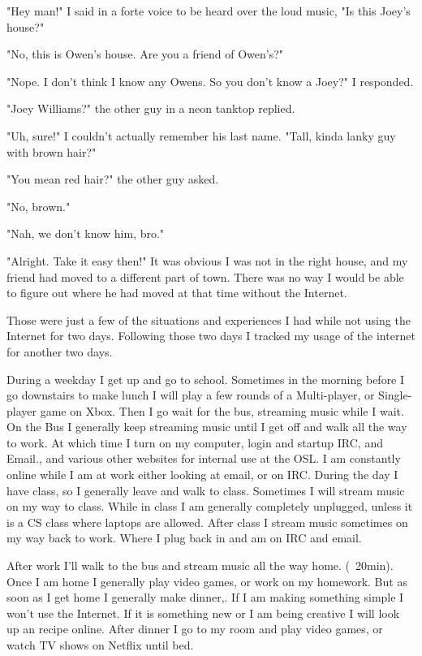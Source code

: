 \documentclass[12pt,letterpaper]{article}
\begin{document}
"Hey man!" I said in a forte voice to be heard over the loud music, "Is
this Joey's house?"

"No, this is Owen's house. Are you a friend of Owen's?" 

"Nope. I don't think I know any Owens. So you don't know a Joey?" I responded.

"Joey Williams?" the other guy in a neon tanktop replied.

"Uh, sure!" I couldn't actually remember his last name. "Tall, kinda
lanky guy with brown hair?"

"You mean red hair?" the other guy asked.

"No, brown."

"Nah, we don't know him, bro."

"Alright. Take it easy then!" It was obvious I was not in the right
house, and my friend had moved to a different part of town. There was
no way I would be able to figure out where he had moved at that time
without the Internet.

Those were just a few of the situations and experiences I had while not
using the Internet for two days. Following those two days I tracked my
usage of the internet for another two days.


During a weekday I get up and go to school. Sometimes in the morning
before I go downstairs to make lunch I will play a few rounds of a
Multi-player, or Single-player game on Xbox. Then I go wait for the bus,
streaming music while I wait. On the Bus I generally keep streaming
music until I get off and walk all the way to work. At which time I turn
on my computer, login and startup IRC, and Email., and various other
websites for internal use at the OSL. I am constantly online while I am
at work either looking at email, or on IRC. During the day I have class,
so I generally leave and walk to class. Sometimes I will stream music on
my way to class. While in class I am generally completely unplugged,
unless it is a CS class where laptops are allowed.  After class I stream
music sometimes on my way back to work.  Where I plug back in and am on
IRC and email.

After work I'll walk to the bus and stream music all the way home.
(~20min). Once I am home I generally play video games, or work on my
homework. But as soon as I get home I generally make dinner,. If I am
making something simple I won't use the Internet. If it is something new
or I am being creative I will look up an recipe online. After dinner I
go to my room and play video games, or watch TV shows on Netflix until
bed.
\end{document}
